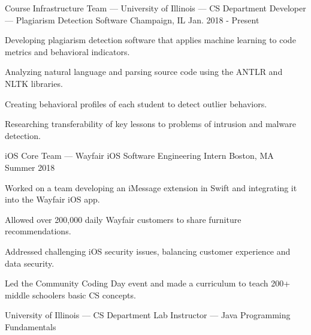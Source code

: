 
\begin{cventries}
\cventry
{Course Infrastructure Team — University of Illinois — CS Department} %
{Developer — Plagiarism Detection Software} %
{Champaign, IL} %
{Jan. 2018 - Present} %
{
	\begin{cvitems} %
		\item {Developing plagiarism detection software that applies machine learning to code metrics and behavioral indicators.}
		\item {Analyzing natural language and parsing source code using the ANTLR and NLTK libraries.}
		\item {Creating behavioral profiles of each student to detect outlier behaviors.}
		\item {Researching transferability of key lessons to problems of intrusion and malware detection.}
	\end{cvitems}
}
\cventry
{\textnormal{i}OS Core Team — Wayfair} %
{iOS Software Engineering Intern} %
{Boston, MA} %
{Summer 2018} %
{
	\begin{cvitems} %
		\item {Worked on a team developing an iMessage extension in Swift and integrating it into the Wayfair iOS app.}
		\item {Allowed over 200,000 daily Wayfair customers to share furniture recommendations.}
		\item {Addressed challenging iOS security issues, balancing customer experience and data security.}
		\item {Led the Community Coding Day event and made a curriculum to teach 200+ middle schoolers basic CS concepts.}
	\end{cvitems}
}
\cventry
{University of Illinois — CS Department} %
{Lab Instructor — Java Programming Fundamentals} %

\end{cventries}
